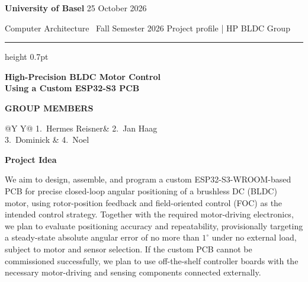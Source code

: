 \documentclass[11pt,a4paper]{article}
\newcommand{\sectionlabel}[1]{%
  \par\vspace{12pt}%
  {\color{accent}\bfseries\fontsize{11.5}{14}\selectfont #1}%
  \par\vspace{4pt}%
}
\newcommand{\MemberOne}{Hermes Reisner}
\newcommand{\MemberTwo}{Jan Haag}
\newcommand{\MemberThree}{Dominick }
\newcommand{\MemberFour}{Noel }
\newcommand{\TargetAngle}{1}
\begin{document}
{\bfseries\fontsize{12}{14}\selectfont University of Basel}%
\hfill{\small\color{muted}25 October 2026}\par
{\small\color{muted}Computer Architecture \textbar\ Fall Semester 2026}%
\hfill{\small\color{muted}Project profile | HP BLDC Group}\par

\vspace{7pt}
{\color{accent}\hrule height 0.7pt}
\vspace{16pt}

{\bfseries\fontsize{23}{26}\selectfont
High-Precision BLDC Motor Control\\
Using a Custom ESP32-S3 PCB\par}

\vspace{13pt}
{\small\bfseries\color{muted}GROUP MEMBERS}\par\vspace{1pt}
{\small
\begin{tabularx}{\linewidth}{@{}Y Y@{}}
1.\ \MemberOne & 2.\ \MemberTwo \\[4pt]
3.\ \MemberThree & 4.\ \MemberFour
\end{tabularx}\par}

\sectionlabel{Project Idea}
We aim to design, assemble, and program a custom ESP32-S3-WROOM-based PCB for precise closed-loop angular positioning of a brushless DC (BLDC) motor, using rotor-position feedback and field-oriented control (FOC) as the intended control strategy.
Together with the required motor-driving electronics, we plan to evaluate positioning accuracy and repeatability, provisionally targeting a steady-state absolute angular error of no more than \(\TargetAngle^\circ\) under no external load, subject to motor and sensor selection.
If the custom PCB cannot be commissioned successfully, we plan to use off-the-shelf controller boards with the necessary motor-driving and sensing components connected externally.
\end{document}
